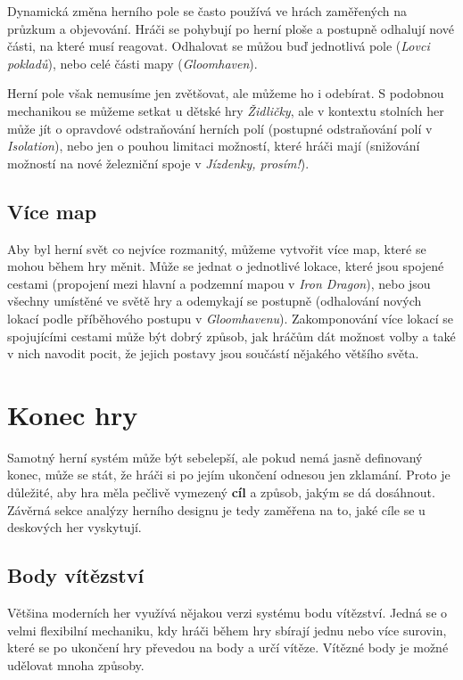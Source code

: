 Dynamická změna herního pole se často používá ve hrách zaměřených na průzkum a objevování. Hráči se pohybují po herní ploše a postupně odhalují nové části, na které musí reagovat. Odhalovat se můžou buď jednotlivá pole (\textit{Lovci pokladů}), nebo celé části mapy (\textit{Gloomhaven}).

Herní pole však nemusíme jen zvětšovat, ale můžeme ho i odebírat. S podobnou mechanikou se můžeme setkat u dětské hry \textit{Židličky}, ale v kontextu stolních her může jít o opravdové odstraňování herních polí (postupné odstraňování polí v \textit{Isolation}), nebo jen o pouhou limitaci možností, které hráči mají (snižování možností na nové železniční spoje v \textit{Jízdenky, prosím!}).

\subsection{Více map}
\label{subsec:multiple_maps}

Aby byl herní svět co nejvíce rozmanitý, můžeme vytvořit více map, které se mohou během hry měnit. Může se jednat o jednotlivé lokace, které jsou spojené cestami (propojení mezi hlavní a podzemní mapou v \textit{Iron Dragon}), nebo jsou všechny umístěné ve světě hry a odemykají se postupně (odhalování nových lokací podle příběhového postupu v \textit{Gloomhavenu}). Zakomponování více lokací se spojujícími cestami může být dobrý způsob, jak hráčům dát možnost volby a také v nich navodit pocit, že jejich postavy jsou součástí nějakého většího světa.



\section{Konec hry}
\label{sec:end}

Samotný herní systém může být sebelepší, ale pokud nemá jasně definovaný konec, může se stát, že hráči si po jejím ukončení odnesou jen zklamání. Proto je důležité, aby hra měla pečlivě vymezený \textbf{cíl} a způsob, jakým se dá dosáhnout. Závěrná sekce analýzy herního designu je tedy zaměřena na to, jaké cíle se u deskových her vyskytují.

\subsection{Body vítězství}
\label{subsec:victory_points}

Většina moderních her využívá nějakou verzi systému bodu vítězství. Jedná se o velmi flexibilní mechaniku, kdy hráči během hry sbírají jednu nebo více surovin, které se po ukončení hry převedou na body a určí vítěze. Vítězné body je možné udělovat mnoha způsoby.

